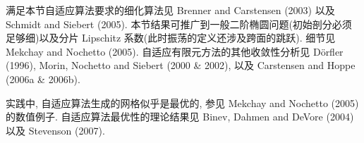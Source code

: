 \begin{Remark}
\label{rem:ch09-refinement-algorithms}
满足本节自适应算法要求的细化算法见 Brenner and Carstensen (2003) 以及 Schmidt and Siebert (2005). 本节结果可推广到一般二阶椭圆问题(初始剖分必须足够细)以及分片 Lipschitz 系数(此时振荡的定义还涉及跨面的跳跃). 细节见 Mekchay and Nochetto (2005). 自适应有限元方法的其他收敛性分析见 Dörfler (1996), Morin, Nochetto and Siebert (2000 \& 2002), 以及 Carstensen and Hoppe (2006a \& 2006b).
\end{Remark}

\begin{Remark}
\label{rem:ch09-adaptive-optimality}
实践中, 自适应算法生成的网格似乎是最优的, 参见 Mekchay and Nochetto (2005) 的数值例子. 自适应算法最优性的理论结果见 Binev, Dahmen and DeVore (2004) 以及 Stevenson (2007).
\end{Remark}
